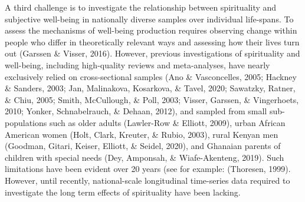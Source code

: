 \documentclass[
  english,
  man,floatsintext]{apa6}
\begin{document}
A third challenge is to investigate the relationship between spirituality and subjective well-being in nationally diverse samples over individual life-spans. To assess the mechanisms of well-being production requires observing change within people who differ in theoretically relevant ways and assessing how their lives turn out (Garssen \& Visser, 2016). However, previous investigations of spirituality and well-being, including high-quality reviews and meta-analyses, have nearly exclusively relied on cross-sectional samples (Ano \& Vasconcelles, 2005; Hackney \& Sanders, 2003; Jan, Malinakova, Kosarkova, \& Tavel, 2020; Sawatzky, Ratner, \& Chiu, 2005; Smith, McCullough, \& Poll, 2003; Visser, Garssen, \& Vingerhoets, 2010; Yonker, Schnabelrauch, \& Dehaan, 2012), and sampled from small sub-populations such as older adults (Lawler-Row \& Elliott, 2009), urban African American women (Holt, Clark, Kreuter, \& Rubio, 2003), rural Kenyan men (Goodman, Gitari, Keiser, Elliott, \& Seidel, 2020), and Ghanaian parents of children with special needs (Dey, Amponsah, \& Wiafe-Akenteng, 2019). Such limitations have been evident over 20 years (see for example: (Thoresen, 1999). However, until recently, national-scale longitudinal time-series data required to investigate the long term effects of spirituality have been lacking.
\end{document}
